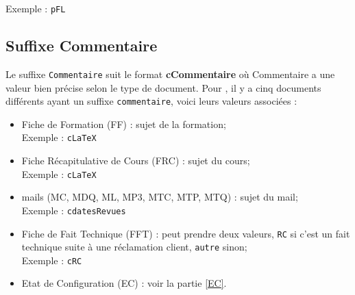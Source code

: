 Exemple : \verb+pFL+

\subsection{Suffixe Commentaire}
\label{suffixe_commentaire}

Le suffixe \verb+Commentaire+ suit le format \textbf{cCommentaire} où Commentaire a une valeur bien précise selon le type de document. Pour \nomEquipe, il y a cinq documents différents ayant un suffixe \verb+commentaire+, voici leurs valeurs associées :
\begin{itemize}
\item Fiche de Formation (FF) : sujet de la formation;\\
 Exemple : \verb+cLaTeX+
 \item Fiche Récapitulative de Cours (FRC) : sujet du cours;\\
 Exemple : \verb+cLaTeX+
\item mails (MC, MDQ, ML, MP3, MTC, MTP, MTQ) : sujet du mail;\\
 Exemple : \verb+cdatesRevues+
\item Fiche de Fait Technique (FFT) : peut prendre deux valeurs, \verb+RC+ si c'est un fait technique suite à une réclamation client, \verb+autre+ sinon;\\
 Exemple : \verb+cRC+
\item Etat de Configuration (EC) : voir la partie \ref{EC}.
\end{itemize}
